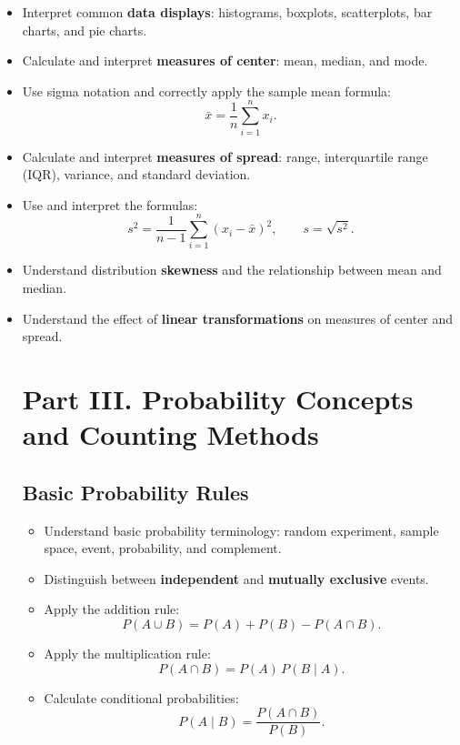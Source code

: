 \documentclass[11pt]{article}
\begin{document}
\begin{itemize}[leftmargin=*]
\item Interpret common \textbf{data displays}: histograms, boxplots, scatterplots, bar charts, and pie charts.
\item Calculate and interpret \textbf{measures of center}: mean, median, and mode.
\item Use sigma notation and correctly apply the sample mean formula:
\[
\bar{x} = \frac{1}{n} \sum_{i=1}^n x_i.
\]

\item Calculate and interpret \textbf{measures of spread}: range, interquartile range (IQR), variance, and standard deviation.

\item Use and interpret the formulas:
\[
s^2 = \frac{1}{n-1} \sum_{i=1}^n (x_i - \bar{x})^2,
\qquad
s = \sqrt{s^2}.
\]

\item Understand distribution \textbf{skewness} and the relationship between mean and median.

\item Understand the effect of \textbf{linear transformations} on measures of center and spread.

\section*{Part III. Probability Concepts and Counting Methods}

\subsection*{Basic Probability Rules}

\begin{itemize}[leftmargin=*]
\item Understand basic probability terminology: random experiment, sample space, event, probability, and complement.
\item Distinguish between \textbf{independent} and \textbf{mutually exclusive} events.
\item Apply the addition rule:
\[
P(A \cup B) = P(A) + P(B) - P(A \cap B).
\]

\item Apply the multiplication rule:
\[
P(A \cap B) = P(A)\,P(B \mid A).
\]

\item Calculate conditional probabilities:
\[
P(A \mid B) = \frac{P(A \cap B)}{P(B)}.
\]


\end{itemize}
\end{itemize}
\end{document}
